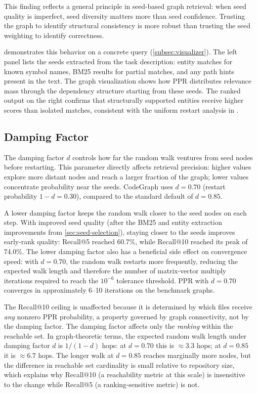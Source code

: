 This finding reflects a general principle in seed-based graph retrieval: when seed quality is imperfect, seed diversity matters more than seed confidence. Trusting the graph to identify structural consistency is more robust than trusting the seed weighting to identify correctness.

 demonstrates this behavior on a concrete query (\cref{subsec:visualizer}). The left panel lists the seeds extracted from the task description: entity matches for known symbol names, BM25 results for partial matches, and any path hints present in the text. The graph visualization shows how PPR distributes relevance mass through the dependency structure starting from these seeds. The ranked output on the right confirms that structurally supported entities receive higher scores than isolated matches, consistent with the uniform restart analysis in .

\subsection{Damping Factor}
\label{sec:damping-factor}

The damping factor $d$ controls how far the random walk ventures from seed nodes before restarting. This parameter directly affects retrieval precision: higher values explore more distant nodes and reach a larger fraction of the graph; lower values concentrate probability near the seeds. CodeGraph uses $d = 0.70$ (restart probability $1 - d = 0.30$), compared to the standard default of $d = 0.85$.

A lower damping factor keeps the random walk closer to the seed nodes on each step. With improved seed quality (after the BM25 and entity extraction improvements from \cref{sec:seed-selection}), staying closer to the seeds improves early-rank quality: Recall@5 reached 60.7\%, while Recall@10 reached its peak of 74.0\%. The lower damping factor also has a beneficial side effect on convergence speed: with $d = 0.70$, the random walk restarts more frequently, reducing the expected walk length and therefore the number of matrix-vector multiply iterations required to reach the $10^{-6}$ tolerance threshold. PPR with $d = 0.70$ converges in approximately 6--10 iterations on the benchmark graphs.

The Recall@10 ceiling is unaffected because it is determined by which files receive \emph{any} nonzero PPR probability, a property governed by graph connectivity, not by the damping factor. The damping factor affects only the \emph{ranking} within the reachable set. In graph-theoretic terms, the expected random walk length under damping factor $d$ is $1/(1-d)$ hops: at $d = 0.70$ this is $\approx 3.3$ hops; at $d = 0.85$ it is $\approx 6.7$ hops. The longer walk at $d = 0.85$ reaches marginally more nodes, but the difference in reachable set cardinality is small relative to repository size, which explains why Recall@10 (a reachability metric at this scale) is insensitive to the change while Recall@5 (a ranking-sensitive metric) is not.

